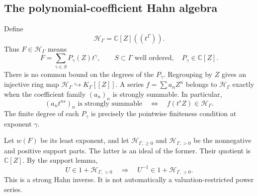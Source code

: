\documentclass[11pt,letterpaper]{article}
\numberwithin{equation}{section}
\theoremstyle{definition}
\theoremstyle{remark}
\newcommand{\C}{\mathbb C}
\begin{document}
\subsection{The polynomial-coefficient Hahn algebra}
Define
\begin{equation}\label{eq:H}
 \mathcal H_\Gamma=\C[Z]((t^\Gamma)).
\end{equation}
Thus $F\in\mathcal H_\Gamma$ means
\[
 F=\sum_{\gamma\in S}P_\gamma(Z)t^\gamma,
 \qquad S\subset\Gamma\text{ well ordered},\quad P_\gamma\in\C[Z].
\]
There is no common bound on the degrees of the $P_\gamma$. Regrouping by $Z$
gives an injective ring map $\mathcal H_\Gamma\hookrightarrow K_\Gamma[[Z]]$.
A series $f=\sum a_nZ^n$ belongs to $\mathcal H_\Gamma$ exactly when the
coefficient family $(a_n)_n$ is strongly summable. In particular,
\begin{equation}\label{eq:rescale-H}
 (a_nt^{ns})_n\text{ is strongly summable}
 \quad\Longleftrightarrow\quad f(t^sZ)\in\mathcal H_\Gamma.
\end{equation}
The finite degree of each $P_\gamma$ is precisely the pointwise finiteness
condition at exponent $\gamma$.

Let $w(F)$ be its least exponent, and let $\mathcal H_{\Gamma,\ge0}$ and
$\mathcal H_{\Gamma,>0}$ be the nonnegative and positive support parts.
The latter is an ideal of the former. Their quotient is $\C[Z]$.
By the support lemma,
\begin{equation}\label{eq:strong-unit}
 U\in1+\mathcal H_{\Gamma,>0}
 \quad\Longrightarrow\quad U^{-1}\in1+\mathcal H_{\Gamma,>0}.
\end{equation}
This is a strong Hahn inverse. It is not automatically a valuation-restricted
power series.
\end{document}
